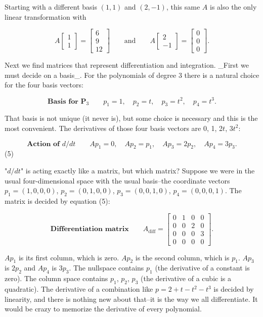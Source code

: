 Starting with a different basis \((1,1)\) and \((2,-1)\), this same \(A\) is also the only linear transformation with

\[A\begin{bmatrix}1\\ 1\end{bmatrix}=\begin{bmatrix}6\\ 9\\ 12\end{bmatrix}\qquad\text{and}\qquad A\begin{bmatrix}2\\ -1\end{bmatrix}=\begin{bmatrix}0\\ 0\\ 0\end{bmatrix}.\]

Next we find matrices that represent differentiation and integration. _First we must decide on a basis_. For the polynomials of degree 3 there is a natural choice for the four basis vectors:

\[\textbf{Basis for P}_{3}\qquad p_{1}=1,\quad p_{2}=t,\quad p_{3}=t^{2},\quad p _{4}=t^{3}.\]

That basis is not unique (it never is), but some choice is necessary and this is the most convenient. The derivatives of those four basis vectors are 0, 1, 2\(t\), 3\(t^{2}\):

\[\textbf{Action of }d/dt\qquad Ap_{1}=0,\quad Ap_{2}=p_{1},\quad Ap_{3}=2p_{2}, \quad Ap_{4}=3p_{3}.\] (5)

"\(d/dt\)" is acting exactly like a matrix, but which matrix? Suppose we were in the usual four-dimensional space with the usual basis--the coordinate vectors \(p_{1}=(1,0,0,0)\), \(p_{2}=(0,1,0,0)\), \(p_{3}=(0,0,1,0)\), \(p_{4}=(0,0,0,1)\). The matrix is decided by equation (5):

\[\textbf{Differentiation matrix}\qquad A_{\text{diff}}=\begin{bmatrix}0&1&0&0 \\ 0&0&2&0\\ 0&0&0&3\\ 0&0&0&0\end{bmatrix}.\]

\(Ap_{1}\) is its first column, which is zero. \(Ap_{2}\) is the second column, which is \(p_{1}\). \(Ap_{3}\) is \(2p_{2}\) and \(Ap_{4}\) is 3\(p_{3}\). The nullspace contains \(p_{1}\) (the derivative of a constant is zero). The column space contains \(p_{1}\), \(p_{2}\), \(p_{3}\) (the derivative of a cubic is a quadratic). The derivative of a combination like \(p=2+t-t^{2}-t^{3}\) is decided by linearity, and there is nothing new about that--it is the way we all differentiate. It would be crazy to memorize the derivative of every polynomial.

